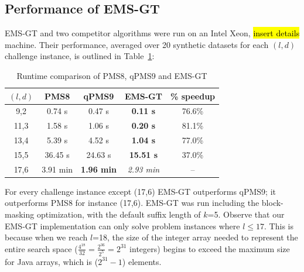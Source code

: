 \documentclass[conference]{IEEEtran}
\begin{document}
	\newpage
	\subsection{Performance of EMS-GT}
		EMS-GT and two competitor algorithms were run on an Intel Xeon, \hl{insert details} machine. Their performance, averaged over 20 synthetic datasets for each $(l,d)$ challenge instance, is outlined in Table~\ref{tbl:runtimes_v_pms}:\newline

		\begin{table}[ht] %
			\renewcommand{\arraystretch}{1.3}
			\caption{Runtime comparison of PMS8, qPMS9 and EMS-GT}
			\label{tbl:runtimes_v_pms}
			\centering
			\begin{tabular}{|c|c|c|c|c|}
			\hline \bfseries\boldmath $(l,d)$ & \bfseries PMS8 & \bfseries qPMS9 & \bfseries EMS-GT & \bfseries \% speedup\\
			\hline
			 9,2 &  0.74 s  &  0.47 s & {\bf 0.11 s} & 76.6\%\\
			11,3 &  1.58 s  &  1.06 s & {\bf 0.20 s} & 81.1\%\\
			13,4 &  5.39 s  &  4.52 s & {\bf 1.04 s} & 77.0\%\\
			15,5 & 36.45 s  & 24.63 s & {\bf15.51 s} & 37.0\%\\
			17,6 &  3.91 min & \textbf{1.96 min} & {\emph{2.93 min}} & --\\
			\hline\end{tabular}
			\end{table}

		
		For every challenge instance except (17,6) EMS-GT outperforms qPMS9; it outperforms PMS8 for instance (17,6). EMS-GT was run including the block-masking optimization, with the default suffix length of $k$=5. Observe that our EMS-GT implementation can only solve problem instances where $l \leq 17$. This is because when we reach $l$=18, the size of the integer array needed to represent the entire search space ($\frac{4^{18}}{32} = \frac{2^{36}}{2^{5}} = 2^{31}$ integers) begins to exceed the maximum size for Java arrays, which is ($2^{31} - 1$) elements.\newline


\end{document}
